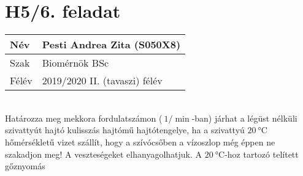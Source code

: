\newcommand*\circled[1]{\tikz[baseline=(char.base)]{
		\node[shape=circle,draw,inner sep=2pt] (char) {#1};}}

\section*{H5/6. feladat}
\begin{tabular}{ | p{2cm} | p{14cm} | } 
	\hline
	Név & Pesti Andrea Zita (S050X8) \\ 
	\hline
	Szak & Biomérnök BSc \\ 
	\hline
	Félév & 2019/2020 II. (tavaszi) félév \\ 
	\hline
\end{tabular}
\vspace{0.5cm} \\
Határozza meg mekkora fordulatszámon ($\SI{}{1\per\min}$-ban) járhat a légüst nélküli szivattyút hajtó kulisszás hajtómű hajtótengelye, ha a szivattyú $\SI{20}{\celsius}$ hőmérsékletű vizet szállít, hogy a szívócsőben a vízoszlop még éppen ne szakadjon meg! A veszteségeket elhanyagolhatjuk. A $\SI{20}{\celsius}$-hoz tartozó telített gőznyomás

